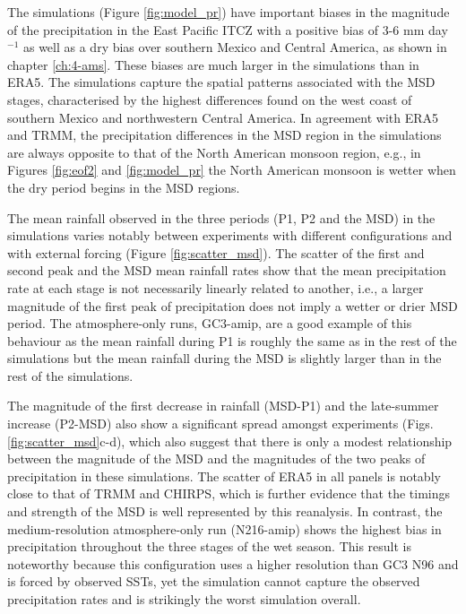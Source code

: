 The simulations (Figure \ref{fig:model_pr}) have important biases in the magnitude of the  precipitation in the East Pacific ITCZ with a positive bias of 3-6 mm day$^{-1}$ as well as a dry bias over southern Mexico and Central America, as shown in chapter \ref{ch:4-ams}. These biases are much larger in the simulations than in ERA5.
The simulations capture the spatial patterns associated with the MSD stages, characterised by the highest differences found on the west coast of southern Mexico and northwestern Central America.
In agreement with ERA5 and TRMM, the precipitation differences in the MSD region in the simulations are always opposite to that of the North American monsoon region, e.g., in Figures \ref{fig:eof2} and \ref{fig:model_pr} the North American monsoon is wetter when the dry period begins in the MSD regions.%
  


The mean rainfall observed in the three periods (P1, P2 and the MSD) in the simulations varies notably between experiments with different configurations and with external forcing (Figure \ref{fig:scatter_msd}). 
 The scatter of the first and second peak and the MSD mean rainfall rates  show that the mean precipitation rate at each stage is not necessarily linearly related to another, i.e., a larger magnitude of the first peak of precipitation does not imply a wetter or drier MSD period. The atmosphere-only runs, GC3-amip, are a good example of this behaviour as the mean rainfall during P1 is roughly the same as in the rest of the simulations but the mean rainfall during the MSD is slightly larger than in the rest of the simulations. 
 

The magnitude of the first decrease in rainfall (MSD-P1) and the late-summer increase (P2-MSD) also show a significant spread amongst experiments (Figs. \ref{fig:scatter_msd}c-d), which also suggest that there is only a modest relationship between the magnitude of the MSD and the magnitudes of the two peaks of precipitation in these simulations. The scatter of ERA5 in all panels is notably close to that of TRMM and CHIRPS, which is further evidence that the timings and strength of the MSD is well represented by this reanalysis. In contrast, the medium-resolution atmosphere-only run (N216-amip) shows the highest bias in precipitation throughout the three stages of the wet season. This result is noteworthy because this configuration uses a higher resolution than GC3 N96 and is forced by observed SSTs, yet the simulation cannot capture the observed precipitation rates and is strikingly the worst simulation overall. %


